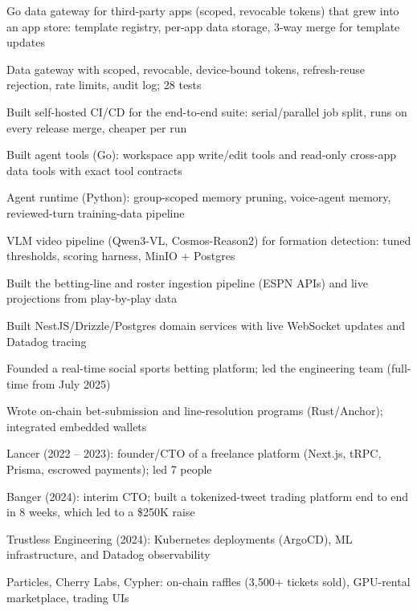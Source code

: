 \documentclass[print]{jack-resume}
\begin{document}
\begin{tightemize}
    \item Go data gateway for third-party apps (scoped, revocable tokens) that grew into an app store: template registry, per-app data storage, 3-way merge for template updates
    \item Data gateway with scoped, revocable, device-bound tokens, refresh-reuse rejection, rate limits, audit log; 28 tests
    \item Built self-hosted CI/CD for the end-to-end suite: serial/parallel job split, runs on every release merge, cheaper per run
    \item Built agent tools (Go): workspace app write/edit tools and read-only cross-app data tools with exact tool contracts
    \item Agent runtime (Python): group-scoped memory pruning, voice-agent memory, reviewed-turn training-data pipeline
    \item VLM video pipeline (Qwen3-VL, Cosmos-Reason2) for formation detection: tuned thresholds, scoring harness, MinIO + Postgres
\end{tightemize}
\sectionsep

\begin{tightemize}
    \item Built the betting-line and roster ingestion pipeline (ESPN APIs) and live projections from play-by-play data
    \item Built NestJS/Drizzle/Postgres domain services with live WebSocket updates and Datadog tracing
    \item Founded a real-time social sports betting platform; led the engineering team (full-time from July 2025)
    \item Wrote on-chain bet-submission and line-resolution programs (Rust/Anchor); integrated embedded wallets
\end{tightemize}
\sectionsep

\begin{tightemize}
    \item Lancer (2022 – 2023): founder/CTO of a freelance platform (Next.js, tRPC, Prisma, escrowed payments); led 7 people
    \item Banger (2024): interim CTO; built a tokenized-tweet trading platform end to end in 8 weeks, which led to a \$250K raise
    \item Trustless Engineering (2024): Kubernetes deployments (ArgoCD), ML infrastructure, and Datadog observability
    \item Particles, Cherry Labs, Cypher: on-chain raffles (3,500+ tickets sold), GPU-rental marketplace, trading UIs
\end{tightemize}
\sectionsep
\end{document}

